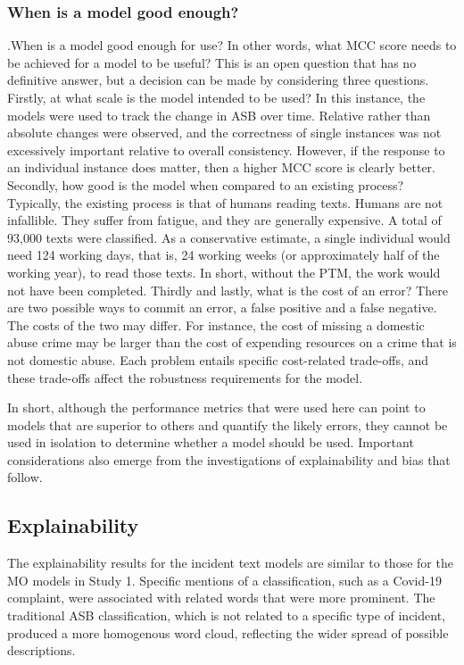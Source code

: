  \subsubsection{When is a model good enough?}  .When is a model good enough for use? In other words, what MCC score needs to be achieved for a model to be useful? This is an open question that has no definitive answer, but a decision can be made by considering three questions. Firstly, at what scale is the model intended to be used? In this instance, the models were used to track the change in ASB over time. Relative rather than absolute changes were observed, and the correctness of single instances was not excessively important relative to overall consistency. However, if the response to an individual instance does matter, then a higher MCC score is clearly better. Secondly, how good is the model when compared to an existing process? Typically, the existing process is that of humans reading texts. Humans are not infallible. They suffer from fatigue, and they are generally expensive. A total of 93,000 texts were classified. As a conservative estimate, a single individual would need 124 working days, that is, 24 working weeks (or approximately half of the working year), to read those texts. In short, without the PTM, the work would not have been completed. Thirdly and lastly, what is the cost of an error? There are two possible ways to commit an error, a false positive and a false negative. The costs of the two may differ. For instance, the cost of missing a domestic abuse crime may be larger than the cost of expending resources on a crime that is not domestic abuse. Each problem entails specific cost-related trade-offs, and these trade-offs affect the robustness requirements for the model. 
 
In short, although the performance metrics that were used here can point to models that are superior to others and quantify the likely errors, they cannot be used in isolation to determine whether a model should be used. Important considerations also emerge from the investigations of explainability and bias that follow.


\subsection{Explainability} The explainability results for the incident text models are similar to those for the MO models in Study 1. Specific mentions of a classification, such as a Covid-19 complaint, were associated with related words that were more prominent. The traditional ASB classification, which is not related to a specific type of incident, produced a more homogenous word cloud, reflecting the wider spread of possible descriptions.

